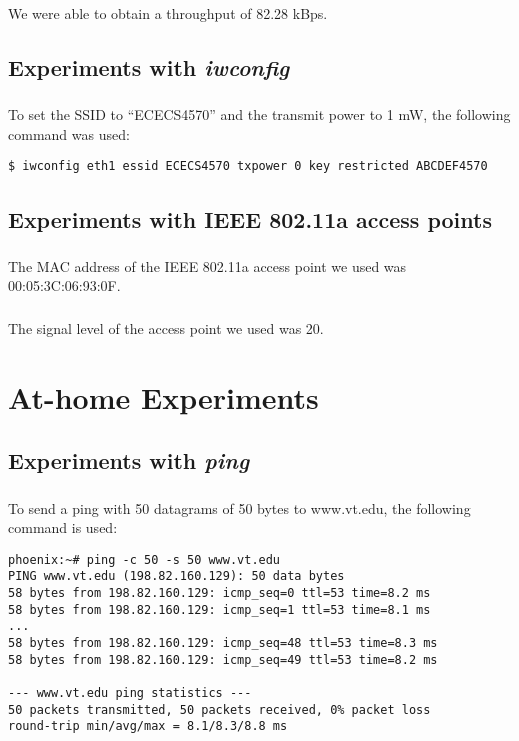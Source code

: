 \documentclass[11pt]{article}
\begin{document}
We were able to obtain a throughput of 82.28 kBps.

\subsection{Experiments with \emph{iwconfig}}

\subsubsection{}

To set the SSID to ``ECECS4570'' and the transmit power to 1 mW, the following command was used:

\verb|$ iwconfig eth1 essid ECECS4570 txpower 0 key restricted ABCDEF4570|

\subsection{Experiments with IEEE 802.11a access points}

\subsubsection{}

The MAC address of the IEEE 802.11a access point we used was 00:05:3C:06:93:0F.

\subsubsection{}

The signal level of the access point we used was 20.

\section{At-home Experiments}

\subsection{Experiments with \emph{ping}}

\subsubsection{}

To send a ping with 50 datagrams of 50 bytes to www.vt.edu, the following command is used:

\begin{verbatim}
phoenix:~# ping -c 50 -s 50 www.vt.edu
PING www.vt.edu (198.82.160.129): 50 data bytes
58 bytes from 198.82.160.129: icmp_seq=0 ttl=53 time=8.2 ms
58 bytes from 198.82.160.129: icmp_seq=1 ttl=53 time=8.1 ms
...
58 bytes from 198.82.160.129: icmp_seq=48 ttl=53 time=8.3 ms
58 bytes from 198.82.160.129: icmp_seq=49 ttl=53 time=8.2 ms

--- www.vt.edu ping statistics ---
50 packets transmitted, 50 packets received, 0% packet loss
round-trip min/avg/max = 8.1/8.3/8.8 ms
\end{verbatim}
\end{document}
